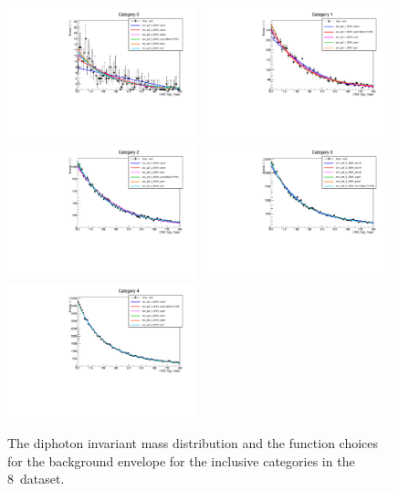 \begin{figure}
  \includegraphics[width=0.49\textwidth]{analysis/plots/mva_8TeV/multipdf_cat0.pdf}
  \includegraphics[width=0.49\textwidth]{analysis/plots/mva_8TeV/multipdf_cat1.pdf}\\
  \includegraphics[width=0.49\textwidth]{analysis/plots/mva_8TeV/multipdf_cat2.pdf}
  \includegraphics[width=0.49\textwidth]{analysis/plots/mva_8TeV/multipdf_cat3.pdf}\\
  \includegraphics[width=0.49\textwidth]{analysis/plots/mva_8TeV/multipdf_cat4.pdf}
  \caption{The diphoton invariant mass distribution and the function choices for the background envelope for the inclusive categories in the 8~\TeV dataset. }
  \label{fig:multipdf4}
\end{figure}

